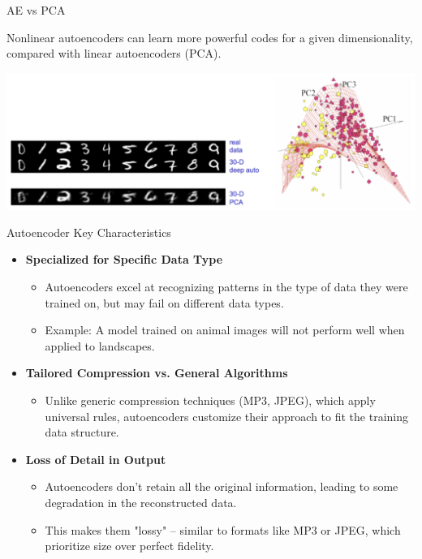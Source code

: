 \documentclass[serif, aspectratio=169]{beamer}
\begin{document}
\begin{frame}{AE vs PCA}

    Nonlinear autoencoders can learn more powerful codes for a given dimensionality, compared with linear autoencoders (PCA).
    
    
    \begin{center}
        \includegraphics[width=\textwidth]{pic/AE vs PCA 2.png} 
    \end{center}
\end{frame}


\begin{frame}{Autoencoder Key Characteristics}
\small
     
    \begin{itemize}
        \item \textbf{Specialized for Specific Data Type}
        \begin{itemize}
            \item Autoencoders excel at recognizing patterns in the type of data they were trained on, but may fail on different data types.
            \item Example: A model trained on animal images will not perform well when applied to landscapes.
        \end{itemize}
        
        \vspace{0.25cm}
        
        \item \textbf{Tailored Compression vs. General Algorithms}
        \begin{itemize}
            \item Unlike generic compression techniques (MP3, JPEG), which apply universal rules, autoencoders customize their approach to fit the training data structure.
        \end{itemize}
        
        \vspace{0.25cm}
        
        \item \textbf{Loss of Detail in Output}
        \begin{itemize}
            \item Autoencoders don’t retain all the original information, leading to some degradation in the reconstructed data.
            \item This makes them "lossy" – similar to formats like MP3 or JPEG, which prioritize size over perfect fidelity.
        \end{itemize}
    \end{itemize}
    

\end{frame}
\end{document}
